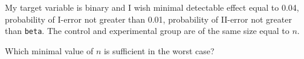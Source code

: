 
\begin{question}
My target variable is binary and I wish minimal detectable effect equal to 0.04, probability of I-error not greater than 0.01, probability of II-error not greater than \texttt{beta}. The control and experimental group
are of the same size equal to \(n\).

Which minimal value of \(n\) is sufficient in the worst case?
\end{question}


